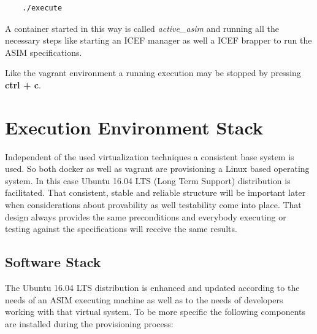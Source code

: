 \begin{lstlisting}
	./execute
\end{lstlisting}

A container started in this way is called \textit{active\_asim} and running all the necessary steps like starting an ICEF manager as well a ICEF brapper to run the ASIM specifications.

Like the vagrant environment a running execution may be stopped by pressing \textbf{ctrl + c}.

\section{Execution Environment Stack}
\label{sec:exec-env-stack}

Independent of the used virtualization techniques a consistent base system is used. So both docker as well as vagrant are provisioning a Linux based operating system. In this case Ubuntu 16.04 LTS (Long Term Support) distribution is facilitated.
That consistent, stable and reliable structure will be important later when considerations about provability as well testability come into place. That design always provides the same preconditions and everybody executing or testing against the specifications will receive the same results.

\subsection{Software Stack}
\label{sec:env-exec-stack-software-stack}

The Ubuntu 16.04 LTS distribution is enhanced and updated according to the needs of an ASIM executing machine as well as to the needs of developers working with that virtual system. To be more specific the following components are installed during the provisioning process:

